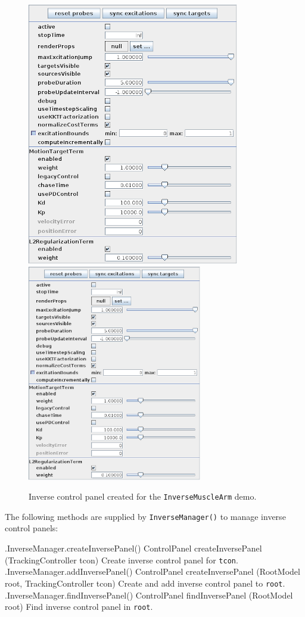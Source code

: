 \begin{figure}[ht]
\begin{center}
\iflatexml
   \includegraphics[]{images/InverseControlPanel}
\else
   \includegraphics[width=3in]{images/InverseControlPanel}
\fi
\end{center}
\caption{Inverse control panel created for the {\tt InverseMuscleArm} demo.}
\label{InverseControlPanel:fig}
\end{figure}

The following methods are supplied by {\tt InverseManager()} to manage inverse
control panels:
%
\begin{methodtable}{0.6}{0.4}
\midline
%
\methodentry
{\inverse.InverseManager.createInversePanel()}%
{ControlPanel createInversePanel (TrackingController tcon)}%
{Create inverse control panel for {\tt tcon}.}%
%
\methodentry
{\inverse.InverseManager.addInversePanel()}%
{ControlPanel createInversePanel (RootModel root, \brh TrackingController tcon)}%
{Create and add inverse control panel to {\tt root}.}%
%
\methodentry
{\inverse.InverseManager.findInversePanel()}%
{ControlPanel findInversePanel (RootModel root)}%
{Find inverse control panel in {\tt root}.}%
%
\midline
\end{methodtable}
%


